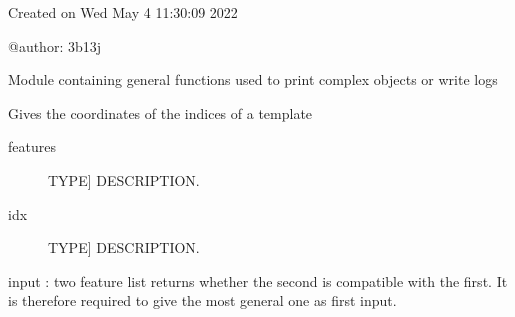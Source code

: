 \documentclass[letterpaper,10pt,english]{sphinxmanual}
\begin{document}
\label{\detokenize{index:module-utilitaries}}
\sphinxAtStartPar
Created on Wed May  4 11:30:09 2022

\sphinxAtStartPar
@author: 3b13j

\sphinxAtStartPar
Module containing general functions used to print complex objects or write logs

\begin{fulllineitems}
\label{\detokenize{index:utilitaries.feature_indices}}
\sphinxAtStartPar
Gives the coordinates of the indices of a template
\begin{description}
\item[{features}] \leavevmode{[}TYPE{]}
\sphinxAtStartPar
DESCRIPTION.

\end{description}
\begin{description}
\item[{idx}] \leavevmode{[}TYPE{]}
\sphinxAtStartPar
DESCRIPTION.

\end{description}

\end{fulllineitems}


\begin{fulllineitems}
\label{\detokenize{index:utilitaries.feature_match}}
\sphinxAtStartPar
input : two feature list 
returns whether the second is compatible with the first.
It is therefore required to give the most general one as first input.

\end{fulllineitems}

\end{document}
